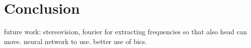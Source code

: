 \section{Conclusion}
future work:
stereovision, fourier for extracting frequencies so that also head can move. neural network to use. better use of bics.
